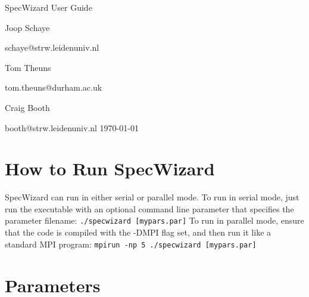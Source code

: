 \documentclass{report}
\begin{document}
\begin{center}
\thispagestyle{empty}
 
 \vspace{20cm}
\begin{Huge}SpecWizard User Guide\end{Huge}
\vspace{5cm}\linebreak

\begin{Large}Joop Schaye\linebreak\end{Large}
{\large schaye@strw.leidenuniv.nl}\vspace{0.5cm}\linebreak
\begin{Large}Tom Theuns\linebreak\end{Large}
{\large tom.theuns@durham.ac.uk}\vspace{0.5cm}\linebreak
\begin{Large}Craig Booth\linebreak\end{Large}
{\large booth@strw.leidenuniv.nl}
\vspace{8cm}\linebreak
\today
\end{center}
\pagebreak
\tableofcontents

\chapter{How to Run SpecWizard}

SpecWizard can run in either serial or parallel mode.  To run in serial mode, just run the executable with an optional command line parameter that specifies the parameter filename:
\linebreak\linebreak
{\tt ./specwizard [mypars.par]}
\linebreak\linebreak
To run in parallel mode, ensure that the code is compiled with the -DMPI flag set, and then run it like a standard MPI program:
\linebreak\linebreak
{\tt mpirun -np 5 ./specwizard [mypars.par]}
\linebreak\linebreak

\chapter{Parameters}
\end{document}
